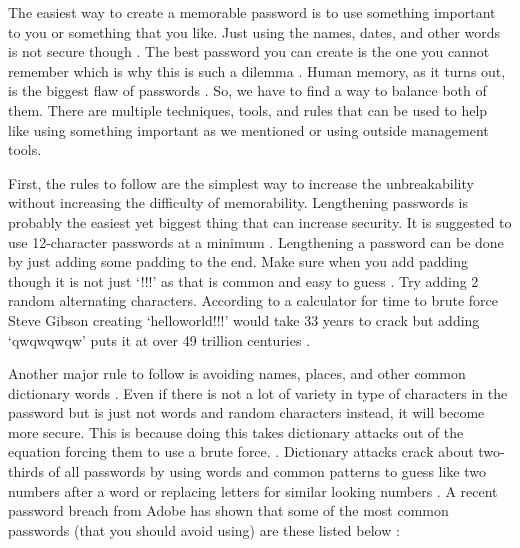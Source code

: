 \documentclass[acmsmall,nonacm]{acmart}
\begin{document}
The easiest way to create a memorable password is to use something important to you or something that you like. Just using the names, dates, and other words is not secure though \cite{rubenking_2021}. The best password you can create is the one you cannot remember which is why this is such a dilemma \cite{lee_2014}. Human memory, as it turns out, is the biggest flaw of passwords \cite{yan_2000}. So, we have to find a way to balance both of them. There are multiple techniques, tools, and rules that can be used to help like using something important as we mentioned or using outside management tools.


First, the rules to follow are the simplest way to increase the unbreakability without increasing the difficulty of memorability. Lengthening passwords is probably the easiest yet biggest thing that can increase security. It is suggested to use 12-character passwords at a minimum \cite{lee_2014}. Lengthening a password can be done by just adding some padding to the end. Make sure when you add padding though it is not just ‘!!!’ as that is common and easy to guess \cite{rubenking_2021}. Try adding 2 random alternating characters. According to a calculator for time to brute force Steve Gibson creating ‘helloworld!!!’ would take 33 years to crack but adding ‘qwqwqwqw’ puts it at over 49 trillion centuries \cite{rubenking_2021}.


Another major rule to follow is avoiding names, places, and other common dictionary words \cite{lee_2014}. Even if there is not a lot of variety in type of characters in the password but is just not words and random characters instead, it will become more secure. This is because doing this takes dictionary attacks out of the equation forcing them to use a brute force. \cite{rubenking_2021}. Dictionary attacks crack about two-thirds of all passwords by using words and common patterns to guess like two numbers after a word or replacing letters for similar looking numbers \cite{lee_2014}. A recent password breach from Adobe has shown that some of the most common passwords (that you should avoid using) are these listed below \cite{lee_2014}:
\end{document}
